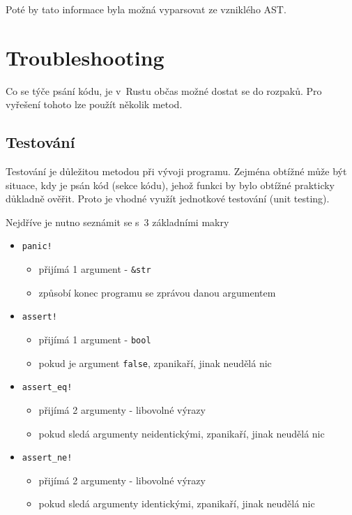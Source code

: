 \documentclass[a4paper, 12pt]{article} %
\newcommand{\rust}[1]{\texttt{#1}}
\begin{document}
			Poté by tato informace byla možná vyparsovat ze vzniklého AST.\cite{atrib_makro}


\section{Troubleshooting}
	Co se týče psání kódu, je v~Rustu občas možné dostat se do rozpaků. Pro vyřešení tohoto lze použít několik metod.


	\subsection{Testování}
		Testování je důležitou metodou při vývoji programu. Zejména obtížné může být situace, kdy je psán kód (sekce kódu), jehož funkci by bylo obtížné prakticky důkladně ověřit. Proto je vhodné využít jednotkové testování (unit testing).
		
		Nejdříve je nutno seznámit se s~3 základními makry
		\begin{itemize}
			\item \rust{panic!}
				\begin{itemize}
					\item přijímá 1 argument - \rust{&str}
					\item způsobí konec programu se zprávou danou argumentem
				\end{itemize} 
			\item \rust{assert!}
				\begin{itemize}
					\item přijímá 1 argument - \rust{bool}
					\item pokud je argument \rust{false}, zpanikaří, jinak neudělá nic
				\end{itemize}
			\item \rust{assert_eq!}
				\begin{itemize}
					\item přijímá 2 argumenty - libovolné výrazy
					\item pokud sledá argumenty neidentickými, zpanikaří, jinak neudělá nic
				\end{itemize}
			\item \rust{assert_ne!}
				\begin{itemize}
					\item přijímá 2 argumenty - libovolné výrazy
					\item pokud sledá argumenty identickými, zpanikaří, jinak neudělá nic
				\end{itemize}
		\end{itemize}
\end{document}
